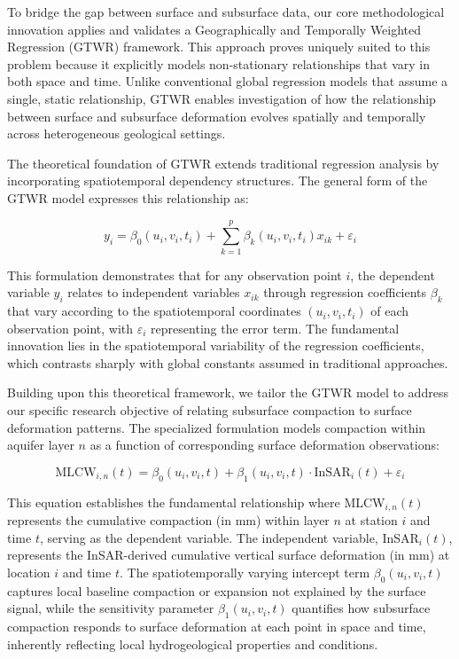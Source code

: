 \documentclass[12pt, a4paper]{article}
\begin{document}
	To bridge the gap between surface and subsurface data, our core methodological innovation applies and validates a Geographically and Temporally Weighted Regression (GTWR) framework. This approach proves uniquely suited to this problem because it explicitly models non-stationary relationships that vary in both space and time. Unlike conventional global regression models that assume a single, static relationship, GTWR enables investigation of how the relationship between surface and subsurface deformation evolves spatially and temporally across heterogeneous geological settings.
	
	The theoretical foundation of GTWR extends traditional regression analysis by incorporating spatiotemporal dependency structures. The general form of the GTWR model expresses this relationship as:
	
	\begin{equation}
		y_i = \beta_{0}(u_i, v_i, t_i) + \sum_{k=1}^{p} \beta_{k}(u_i, v_i, t_i) x_{ik} + \varepsilon_i
	\end{equation}
	
	This formulation demonstrates that for any observation point $i$, the dependent variable $y_i$ relates to independent variables $x_{ik}$ through regression coefficients $\beta_{k}$ that vary according to the spatiotemporal coordinates $(u_i, v_i, t_i)$ of each observation point, with $\varepsilon_i$ representing the error term. The fundamental innovation lies in the spatiotemporal variability of the regression coefficients, which contrasts sharply with global constants assumed in traditional approaches.
	
	Building upon this theoretical framework, we tailor the GTWR model to address our specific research objective of relating subsurface compaction to surface deformation patterns. The specialized formulation models compaction within aquifer layer $n$ as a function of corresponding surface deformation observations:
	
	\begin{equation}
		\text{MLCW}_{i,n}(t) = \beta_{0}(u_i, v_i, t) + \beta_{1}(u_i, v_i, t) \cdot \text{InSAR}_{i}(t) + \varepsilon_i
		\label{eq:gtwr_specific}
	\end{equation}
	
	This equation establishes the fundamental relationship where MLCW$_{i,n}(t)$ represents the cumulative compaction (in mm) within layer $n$ at station $i$ and time $t$, serving as the dependent variable. The independent variable, InSAR$_{i}(t)$, represents the InSAR-derived cumulative vertical surface deformation (in mm) at location $i$ and time $t$. The spatiotemporally varying intercept term $\beta_{0}(u_i, v_i, t)$ captures local baseline compaction or expansion not explained by the surface signal, while the sensitivity parameter $\beta_{1}(u_i, v_i, t)$ quantifies how subsurface compaction responds to surface deformation at each point in space and time, inherently reflecting local hydrogeological properties and conditions.
	
\end{document}
